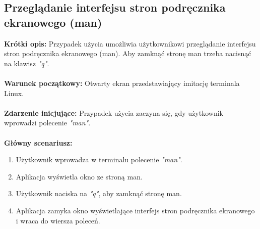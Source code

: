 \documentclass[10pt,a4paper]{report}
\begin{document}
\begin{adjustwidth}{2cm}{2cm}
\subsection{Przeglądanie interfejsu stron podręcznika ekranowego (man)}
\begin{minipage}{1\linewidth}
\textbf{Krótki opis:} Przypadek użycia umożliwia użytkownikowi przeglądanie interfejsu stron podręcznika ekranowego (man). Aby zamknąć stronę man trzeba nacisnąć na klawisz \textit{"q"}. \\ \\
\textbf{Warunek początkowy:} Otwarty ekran przedstawiający imitację terminala Linux.\\ \\
\textbf{Zdarzenie inicjujące:} Przypadek użycia zaczyna się, gdy użytkownik wprowadzi polecenie \textit{"man"}. \\ \\
\textbf{Główny scenariusz:} 
\begin{enumerate}
\setlength\itemsep{0.2cm}
    \item Użytkownik wprowadza w terminalu polecenie \textit{"man"}.
    \item Aplikacja wyświetla okno ze stroną man.
    \item Użytkownik naciska na \textit{"q"}, aby zamknąć stronę man. 
    \item Aplikacja zamyka okno wyświetlające interfejs stron podręcznika ekranowego i wraca do wiersza poleceń.
\end{enumerate}
\end{minipage}

\end{adjustwidth}
\end{document}
